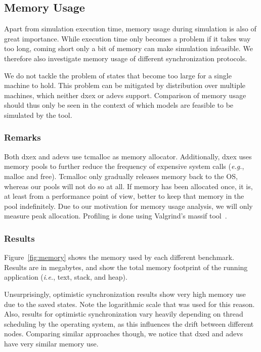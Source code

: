 \subsection{Memory Usage}
Apart from simulation execution time, memory usage during simulation is also of great importance.
While execution time only becomes a problem if it takes way too long, coming short only a bit of memory can make simulation infeasible.
We therefore also investigate memory usage of different synchronization protocols.

We do not tackle the problem of states that become too large for a single machine to hold.
This problem can be mitigated by distribution over multiple machines, which neither dxex or adevs support.
Comparison of memory usage should thus only be seen in the context of which models are feasible to be simulated by the tool.

\subsubsection{Remarks}
Both dxex and adevs use tcmalloc as memory allocator.
Additionally, dxex uses memory pools to further reduce the frequency of expensive system calls (\textit{e.g.}, malloc and free).
Tcmalloc only gradually releases memory back to the OS, whereas our pools will not do so at all.
If memory has been allocated once, it is, at least from a performance point of view, better to keep that memory in the pool indefinitely.
Due to our motivation for memory usage analysis, we will only measure peak allocation.
Profiling is done using Valgrind's massif tool~\cite{Nethercote:2007:VFH:1273442.1250746}.

\subsubsection{Results}
Figure~\ref{fig:memory} shows the memory used by each different benchmark.
Results are in megabytes, and show the total memory footprint of the running application (\textit{i.e.}, text, stack, and heap).

Unsurprisingly, optimistic synchronization results show very high memory use due to the saved states.
Note the logarithmic scale that was used for this reason.
Also, results for optimistic synchronization vary heavily depending on thread scheduling by the operating system, as this influences the drift between different nodes.
Comparing similar approaches though, we notice that dxed and adevs have very similar memory use.

